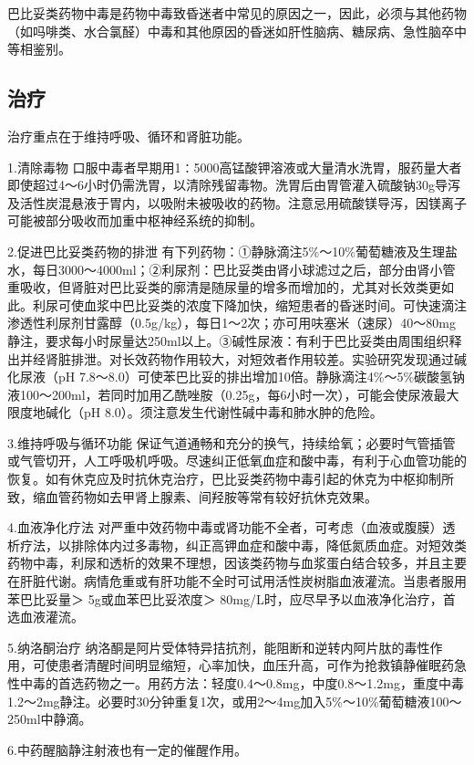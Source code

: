 巴比妥类药物中毒是药物中毒致昏迷者中常见的原因之一，因此，必须与其他药物（如吗啡类、水合氯醛）中毒和其他原因的昏迷如肝性脑病、糖尿病、急性脑卒中等相鉴别。

\subsection{治疗}

治疗重点在于维持呼吸、循环和肾脏功能。

1.清除毒物
口服中毒者早期用1∶5000高锰酸钾溶液或大量清水洗胃，服药量大者即使超过4～6小时仍需洗胃，以清除残留毒物。洗胃后由胃管灌入硫酸钠30g导泻及活性炭混悬液于胃内，以吸附未被吸收的药物。注意忌用硫酸镁导泻，因镁离子可能被部分吸收而加重中枢神经系统的抑制。

2.促进巴比妥类药物的排泄
有下列药物：①静脉滴注5\%～10\%葡萄糖液及生理盐水，每日3000～4000ml；②利尿剂：巴比妥类由肾小球滤过之后，部分由肾小管重吸收，但肾脏对巴比妥类的廓清是随尿量的增多而增加的，尤其对长效类更如此。利尿可使血浆中巴比妥类的浓度下降加快，缩短患者的昏迷时间。可快速滴注渗透性利尿剂甘露醇（0.5g/kg），每日1～2次；亦可用呋塞米（速尿）40～80mg静注，要求每小时尿量达250ml以上。③碱性尿液：有利于巴比妥类由周围组织释出并经肾脏排泄。对长效药物作用较大，对短效者作用较差。实验研究发现通过碱化尿液（pH
7.8～8.0）可使苯巴比妥的排出增加10倍。静脉滴注4\%～5\%碳酸氢钠液100～200ml，若同时加用乙酰唑胺（0.25g，每6小时一次），可能会使尿液最大限度地碱化（pH
8.0）。须注意发生代谢性碱中毒和肺水肿的危险。

3.维持呼吸与循环功能
保证气道通畅和充分的换气，持续给氧；必要时气管插管或气管切开，人工呼吸机呼吸。尽速纠正低氧血症和酸中毒，有利于心血管功能的恢复。如有休克应及时抗休克治疗，巴比妥类药物中毒引起的休克为中枢抑制所致，缩血管药物如去甲肾上腺素、间羟胺等常有较好抗休克效果。

4.血液净化疗法
对严重中效药物中毒或肾功能不全者，可考虑（血液或腹膜）透析疗法，以排除体内过多毒物，纠正高钾血症和酸中毒，降低氮质血症。对短效类药物中毒，利尿和透析的效果不理想，因该类药物与血浆蛋白结合较多，并且主要在肝脏代谢。病情危重或有肝功能不全时可试用活性炭树脂血液灌流。当患者服用苯巴比妥量＞
5g或血苯巴比妥浓度＞ 80mg/L时，应尽早予以血液净化治疗，首选血液灌流。

5.纳洛酮治疗
纳洛酮是阿片受体特异拮抗剂，能阻断和逆转内阿片肽的毒性作用，可使患者清醒时间明显缩短，心率加快，血压升高，可作为抢救镇静催眠药急性中毒的首选药物之一。用药方法：轻度0.4～0.8mg，中度0.8～1.2mg，重度中毒1.2～2mg静注。必要时30分钟重复1次，或用2～4mg加入5\%～10\%葡萄糖液100～250ml中静滴。

6.中药醒脑静注射液也有一定的催醒作用。

